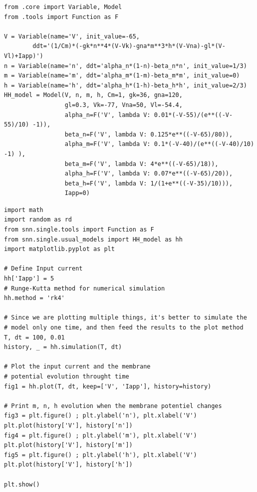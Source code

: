 \documentclass[12pt]{scrartcl}
\begin{document}
\begin{lstlisting}[caption = {Défintion du modèle}]
from .core import Variable, Model
from .tools import Function as F

V = Variable(name='V', init_value=-65,
		ddt='(1/Cm)*(-gk*n**4*(V-Vk)-gna*m**3*h*(V-Vna)-gl*(V-Vl)+Iapp)')
n = Variable(name='n', ddt='alpha_n*(1-n)-beta_n*n', init_value=1/3)
m = Variable(name='m', ddt='alpha_m*(1-m)-beta_m*m', init_value=0)
h = Variable(name='h', ddt='alpha_h*(1-h)-beta_h*h', init_value=2/3)
HH_model = Model(V, n, m, h, Cm=1, gk=36, gna=120, 
				 gl=0.3, Vk=-77, Vna=50, Vl=-54.4, 
				 alpha_n=F('V', lambda V: 0.01*(-V-55)/(e**((-V-55)/10) -1)), 
				 beta_n=F('V', lambda V: 0.125*e**((-V-65)/80)),
				 alpha_m=F('V', lambda V: 0.1*(-V-40)/(e**((-V-40)/10) -1) ),
				 beta_m=F('V', lambda V: 4*e**((-V-65)/18)),
				 alpha_h=F('V', lambda V: 0.07*e**((-V-65)/20)),
				 beta_h=F('V', lambda V: 1/(1+e**((-V-35)/10))), 
				 Iapp=0)
\end{lstlisting}

\begin{lstlisting}[caption = {Simulation du modèle 1}]
import math
import random as rd 
from snn.single.tools import Function as F
from snn.single.usual_models import HH_model as hh
import matplotlib.pyplot as plt

# Define Input current
hh['Iapp'] = 5
# Runge-Kutta method for numerical simulation
hh.method = 'rk4'

# Since we are plotting multiple things, it's better to simulate the
# model only one time, and then feed the results to the plot method
T, dt = 100, 0.01
history, _ = hh.simulation(T, dt)

# Plot the input current and the membrane 
# potential evolution throught time
fig1 = hh.plot(T, dt, keep=['V', 'Iapp'], history=history)

# Print m, n, h evolution when the membrane potentiel changes
fig3 = plt.figure() ; plt.ylabel('n'), plt.xlabel('V')
plt.plot(history['V'], history['n'])
fig4 = plt.figure() ; plt.ylabel('m'), plt.xlabel('V')
plt.plot(history['V'], history['m']) 
fig5 = plt.figure() ; plt.ylabel('h'), plt.xlabel('V')
plt.plot(history['V'], history['h']) 

plt.show()
\end{lstlisting}
\end{document}
